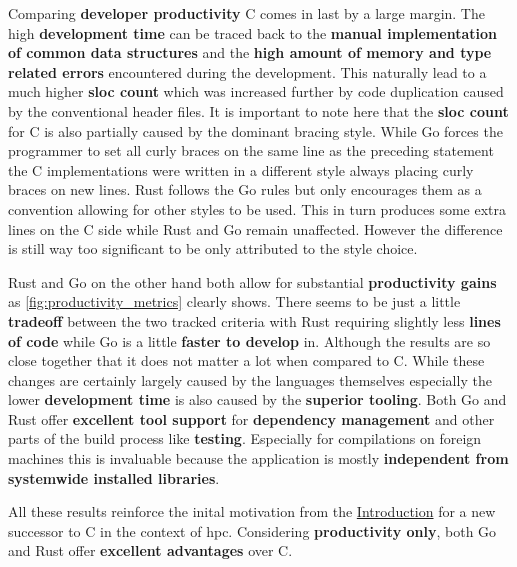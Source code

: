 Comparing \textbf{developer productivity} C comes in last by a large margin. The high \textbf{development time} can be traced back to the \textbf{manual implementation of common data structures} and the \textbf{high amount of memory and type related errors} encountered during the development. This naturally lead to a much higher \textbf{\gls{sloc} count} which was increased further by code duplication caused by the conventional header files. It is important to note here that the \textbf{\gls{sloc} count} for C is also partially caused by the dominant bracing style. While Go forces the programmer to set all curly braces on the same line as the preceding statement the C implementations were written in a different style always placing curly braces on new lines. Rust follows the Go rules but only encourages them as a convention allowing for other styles to be used. This in turn produces some extra lines on the C side while Rust and Go remain unaffected. However the difference is still way too significant to be only attributed to the style choice.

Rust and Go on the other hand both allow for substantial \textbf{productivity gains} as \autoref{fig:productivity_metrics} clearly shows. There seems to be just a little \textbf{tradeoff} between the two tracked criteria with Rust requiring slightly less \textbf{lines of code} while Go is a little \textbf{faster to develop} in. Although the results are so close together that it does not matter a lot when compared to C. While these changes are certainly largely caused by the languages themselves especially the lower \textbf{development time} is also caused by the \textbf{superior tooling}. Both Go and Rust offer \textbf{excellent tool support} for \textbf{dependency management} and other parts of the build process like \textbf{testing}. Especially for compilations on foreign machines this is invaluable because the application is mostly \textbf{independent from systemwide installed libraries}.

All these results reinforce the inital motivation from the \hyperref[sec:Introduction::Motivation]{Introduction} for a new successor to C in the context of \acrlong{hpc}. Considering \textbf{productivity only}, both Go and Rust offer \textbf{excellent advantages} over C.
